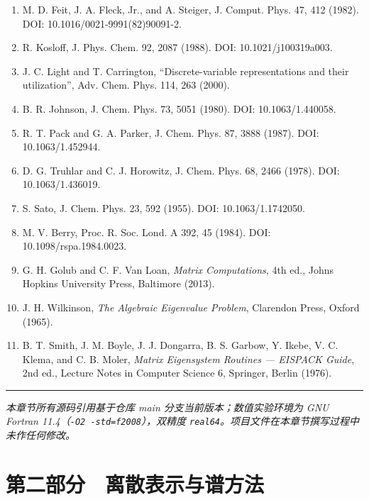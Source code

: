 \documentclass[
]{ctexbook}
\let\origsection\section
\renewcommand{\section}[1]{%
  \needspace{9\baselineskip}%
  \origsection{#1}%
}
\begin{document}
\begin{enumerate}
  DOI: 10.1063/1.456888.
\item
  M. D. Feit, J. A. Fleck, Jr., and A. Steiger, J. Comput. Phys. 47, 412
  (1982). DOI: 10.1016/0021-9991(82)90091-2.
\item
  R. Kosloff, J. Phys. Chem. 92, 2087 (1988). DOI: 10.1021/j100319a003.
\item
  J. C. Light and T. Carrington, ``Discrete-variable representations and
  their utilization'', Adv. Chem. Phys. 114, 263 (2000).
\item
  B. R. Johnson, J. Chem. Phys. 73, 5051 (1980). DOI: 10.1063/1.440058.
\item
  R. T. Pack and G. A. Parker, J. Chem. Phys. 87, 3888 (1987). DOI:
  10.1063/1.452944.
\item
  D. G. Truhlar and C. J. Horowitz, J. Chem. Phys. 68, 2466 (1978). DOI:
  10.1063/1.436019.
\item
  S. Sato, J. Chem. Phys. 23, 592 (1955). DOI: 10.1063/1.1742050.
\item
  M. V. Berry, Proc. R. Soc. Lond. A 392, 45 (1984). DOI:
  10.1098/rspa.1984.0023.
\item
  G. H. Golub and C. F. Van Loan, \emph{Matrix Computations}, 4th ed.,
  Johns Hopkins University Press, Baltimore (2013).
\item
  J. H. Wilkinson, \emph{The Algebraic Eigenvalue Problem}, Clarendon
  Press, Oxford (1965).
\item
  B. T. Smith, J. M. Boyle, J. J. Dongarra, B. S. Garbow, Y. Ikebe, V.
  C. Klema, and C. B. Moler, \emph{Matrix Eigensystem Routines ---
  EISPACK Guide}, 2nd ed., Lecture Notes in Computer Science 6,
  Springer, Berlin (1976).
\end{enumerate}

\begin{center}\rule{0.5\linewidth}{0.5pt}\end{center}

\emph{本章节所有源码引用基于仓库 main 分支当前版本；数值实验环境为 GNU
Fortran 11.4（\texttt{-O2\ -std=f2008}），双精度
\texttt{real64}。项目文件在本章节撰写过程中未作任何修改。}

\hypertarget{ux7b2cux4e8cux90e8ux5206-ux79bbux6563ux8868ux793aux4e0eux8c31ux65b9ux6cd5}{%
\section{第二部分　离散表示与谱方法}\label{ux7b2cux4e8cux90e8ux5206-ux79bbux6563ux8868ux793aux4e0eux8c31ux65b9ux6cd5}}
\end{document}
